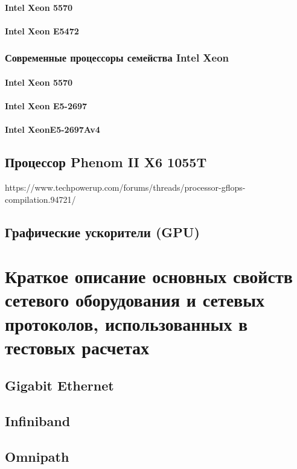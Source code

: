 \subsubsection{Intel Xeon 5570}
\subsubsection{Intel Xeon E5472}


\subsection{Современные процессоры семейства Intel Xeon}
\subsubsection{Intel Xeon 5570}
\subsubsection{Intel Xeon E5-2697}
\subsubsection{Intel XeonE5-2697Av4}

\section{Процессор Phenom II X6 1055T}
https://www.techpowerup.com/forums/threads/processor-gflops-compilation.94721/

\section{Графические ускорители (GPU)}



\chapter{Краткое описание основных свойств сетевого оборудования и сетевых протоколов, использованных в тестовых расчетах} \label{AppendixB}

\section{Gigabit Ethernet}
\section{Infiniband}
\section{Omnipath}



